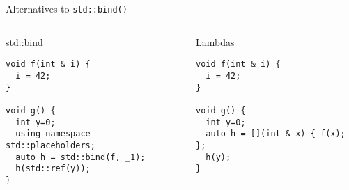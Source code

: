 \begin{frame}[t,fragile]{Alternatives to \texttt{std::bind()}}
\begin{columns}[T]

\begin{block}{std::bind}
\begin{lstlisting}
void f(int & i) {
  i = 42;
}

void g() {
  int y=0;
  using namespace std::placeholders;
  auto h = std::bind(f, _1);
  h(std::ref(y));
}
\end{lstlisting}
\end{block}

\begin{block}{Lambdas}
\begin{lstlisting}
void f(int & i) {
  i = 42;
}

void g() {
  int y=0;
  auto h = [](int & x) { f(x); };
  h(y);
}
\end{lstlisting}
\end{block}

\end{columns}

\end{frame}
